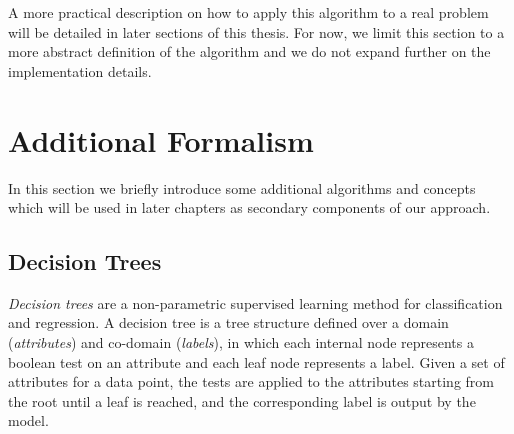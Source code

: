 A more practical description on how to apply this algorithm to a real problem
will be detailed in later sections of this thesis. For now, we limit this 
section to a more abstract definition of the algorithm and we do not expand 
further on the implementation details. 

\section{Additional Formalism} \label{s:addtional}
In this section we briefly introduce some additional algorithms and concepts 
which will be used in later chapters as secondary components of our approach. 

\subsection{Decision Trees}
\textit{Decision trees} are a non-parametric supervised learning method for
classification and regression. A decision tree is a tree structure defined 
over a domain (\textit{attributes}) and co-domain (\textit{labels}), in which
each internal node represents a boolean test on an attribute and each leaf node 
represents a label. Given a set of attributes for a data point, the tests 
are applied to the attributes starting from the root until a leaf is reached, 
and the corresponding label is output by the model. 

